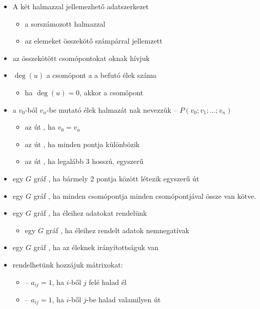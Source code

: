 \documentclass[main.tex]{subfiles}
\begin{document}
  \begin{itemize}
    \item A  két halmazzal jellemezhető adatszerkezet
    \begin{itemize}
      \item a  sorszámozott halmazzal
      
      \item az elemeket összekötő számpárral jellemzett
    \end{itemize}

    \item az összekötött csomópontokat oknak hívjuk
    
    \item $\deg(u)$ a csomópont a a befutó élek száma
    \begin{itemize}
      \item ha $\deg(u) = 0$, akkor a csomópont 
    \end{itemize}

    \item a $v_0$-ból $v_n$-be mutató élek halmazát
    nak nevezzük – $P \left( v_0; v_1; \dots ;v_n \right)$
    \begin{itemize}
      \item az út , ha $v_0 = v_n$
      \item az út , ha minden pontja különbözik
      \item az út , ha legalább 3 hosszú, egyszerű
    \end{itemize}

    \item egy $G$ gráf ,
    ha bármely 2 pontja között létezik egyszerű út

    \item egy $G$ gráf ,
    ha minden csomópontja minden csomópontjával össze van kötve.

    \item egy $G$ gráf ,
    ha éleihez adatokat rendelünk
    \begin{itemize}
      \item egy $G$ gráf ,
      ha éleihez rendelt adatok nemnegatívak
    \end{itemize}

    \item egy $G$ gráf ,
    ha az éleknek irányítottságuk van

    \item rendelhetünk hozzájuk mátrixokat:
    \begin{itemize}
      \item {} – $a_{ij} = 1$,
      ha $i$-ből $j$ felé halad él 
      
      \item {} – $a_{ij} = 1$,
      ha $i$-ből $j$-be halad valamilyen út 
    \end{itemize}
  \end{itemize}  
  
\end{document}
